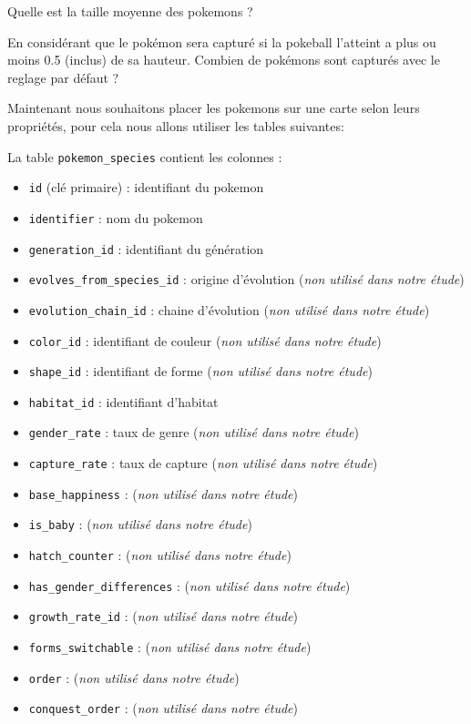 \question{}
Quelle est la taille moyenne des pokemons ?





\question{}
En considérant que le pokémon sera capturé si la pokeball l'atteint a plus ou moins 0.5 (inclus) de sa hauteur. Combien de pokémons sont capturés avec le reglage par défaut ?

Maintenant nous souhaitons placer les pokemons sur une carte selon leurs propriétés, pour cela nous allons utiliser les tables suivantes:


La table \texttt{pokemon\_species} contient les colonnes :

\begin{itemize}[itemsep=0mm]
	\item \texttt{id} (clé primaire) : identifiant du pokemon 
	\item \texttt{identifier} : nom du pokemon
	\item \texttt{generation\_id} : identifiant du génération 
	\item \texttt{evolves\_from\_species\_id} : origine d'évolution (\emph{non utilisé dans notre étude})
	\item \texttt{evolution\_chain\_id} : chaine d'évolution (\emph{non utilisé dans notre étude})
	\item \texttt{color\_id} : identifiant de couleur (\emph{non utilisé dans notre étude})
	\item \texttt{shape\_id} : identifiant de forme (\emph{non utilisé dans notre étude})
	\item \texttt{habitat\_id} : identifiant d'habitat
	\item \texttt{gender\_rate} : taux de genre (\emph{non utilisé dans notre étude})
	\item \texttt{capture\_rate} : taux de capture (\emph{non utilisé dans notre étude})
	\item \texttt{base\_happiness} : (\emph{non utilisé dans notre étude})
	\item \texttt{is\_baby} : (\emph{non utilisé dans notre étude})
	\item \texttt{hatch\_counter} : (\emph{non utilisé dans notre étude})
	\item \texttt{has\_gender\_differences} : (\emph{non utilisé dans notre étude})
	\item \texttt{growth\_rate\_id} : (\emph{non utilisé dans notre étude})
	\item \texttt{forms\_switchable} : (\emph{non utilisé dans notre étude})
	\item \texttt{order} : (\emph{non utilisé dans notre étude})
	\item \texttt{conquest\_order} : (\emph{non utilisé dans notre étude})
\end{itemize}


